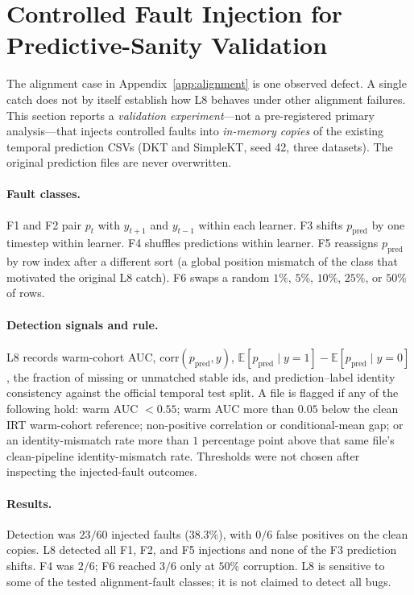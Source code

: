 
\section{Controlled Fault Injection for Predictive-Sanity Validation}
\label{app:l8_fault}
The alignment case in Appendix~\ref{app:alignment} is one observed defect. A single catch does not by itself establish how L8 behaves under other alignment failures. This section reports a \emph{validation experiment}---not a pre-registered primary analysis---that injects controlled faults into \emph{in-memory copies} of the existing temporal prediction CSVs (DKT and SimpleKT, seed 42, three datasets). The original prediction files are never overwritten.

\paragraph{Fault classes.}
F1 and F2 pair $p_t$ with $y_{t+1}$ and $y_{t-1}$ within each learner. F3 shifts $p_{\mathrm{pred}}$ by one timestep within learner. F4 shuffles predictions within learner. F5 reassigns $p_{\mathrm{pred}}$ by row index after a different sort (a global position mismatch of the class that motivated the original L8 catch). F6 swaps a random $1\%$, $5\%$, $10\%$, $25\%$, or $50\%$ of rows.

\paragraph{Detection signals and rule.}
L8 records warm-cohort AUC, $\mathrm{corr}(p_{\mathrm{pred}},y)$, $\mathbb{E}[p_{\mathrm{pred}}\mid y=1]-\mathbb{E}[p_{\mathrm{pred}}\mid y=0]$, the fraction of missing or unmatched stable ids, and prediction--label identity consistency against the official temporal test split. A file is flagged if any of the following hold: warm AUC $< 0.55$; warm AUC more than $0.05$ below the clean IRT warm-cohort reference; non-positive correlation or conditional-mean gap; or an identity-mismatch rate more than $1$ percentage point above that same file's clean-pipeline identity-mismatch rate. Thresholds were not chosen after inspecting the injected-fault outcomes.

\paragraph{Results.}
Detection was $23/60$ injected faults ($38.3\%$), with $0/6$ false positives on the clean copies. L8 detected all F1, F2, and F5 injections and none of the F3 prediction shifts. F4 was $2/6$; F6 reached $3/6$ only at $50\%$ corruption. L8 is sensitive to some of the tested alignment-fault classes; it is not claimed to detect all bugs.
